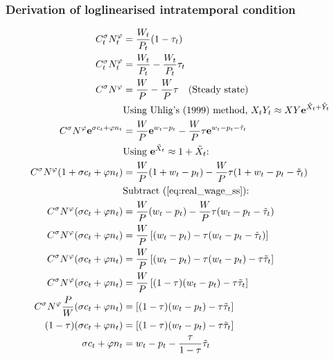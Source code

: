 \subsubsection*{Derivation of loglinearised intratemporal condition}
\begin{align}
    C_t^\sigma N_t^\varphi &= \frac{W_t}{P_t}(1-\tau_t) \\
    C_t^\sigma N_t^\varphi &= \frac{W_t}{P_t} - \frac{W_t}{P_t}\tau_t \\
    C^\sigma N^\varphi &= \frac{W}{P} - \frac{W}{P}\tau \label{eq:real_wage_ss} \quad \text{(Steady state)}\\
    &\text{Using Uhlig's (1999) method, $X_tY_t \approx XY\mathbf{e}^{\tilde{X}_t + \tilde{Y}_t}$}\\
    C^\sigma N^\varphi\mathbf{e}^{\sigma c_t + \varphi n_t} &= \frac{W}{P}\mathbf{e}^{w_t - p_t} - \frac{W}{P}\tau \mathbf{e}^{w_t - p_t - \tilde{\tau}_t}\\
    &\text{Using $\mathbf{e}^{\tilde{X}_t} \approx 1 + {\tilde{X}_t}$: }\\
    C^\sigma N^\varphi({1+\sigma c_t + \varphi n_t}) &= \frac{W}{P}({1+ w_t - p_t}) - \frac{W}{P}\tau ({1+ w_t - p_t - \tilde{\tau}_t})\\
    &\text{Subtract (\ref{eq:real_wage_ss}): } \\
    C^\sigma N^\varphi({\sigma c_t + \varphi n_t}) &= \frac{W}{P}({w_t - p_t}) - \frac{W}{P}\tau ({w_t - p_t - \tilde{\tau}_t})\\
    C^\sigma N^\varphi({\sigma c_t + \varphi n_t}) &= \frac{W}{P}\left[({w_t - p_t}) - \tau ({w_t - p_t - \tilde{\tau}_t})\right]\\
    C^\sigma N^\varphi({\sigma c_t + \varphi n_t}) &= \frac{W}{P}\left[({w_t - p_t}) - \tau ({w_t - p_t}) - \tau \tilde{\tau}_t\right]\\
    C^\sigma N^\varphi({\sigma c_t + \varphi n_t}) &= \frac{W}{P}\left[(1-\tau)({w_t - p_t}) - \tau \tilde{\tau}_t\right]\\
    C^\sigma N^\varphi \frac{P}{W} ({\sigma c_t + \varphi n_t})  &= \left[(1-\tau)({w_t - p_t}) - \tau \tilde{\tau}_t\right]\\
    (1-\tau)({\sigma c_t + \varphi n_t})  &= \left[(1-\tau)({w_t - p_t}) - \tau \tilde{\tau}_t\right]  \label{eq:intratemporal_loglinear_final_step} \\
    {\sigma c_t + \varphi n_t}  &= {w_t - p_t} - \frac{\tau}{1-\tau}\tilde{\tau}_t
\end{align}
\newpage